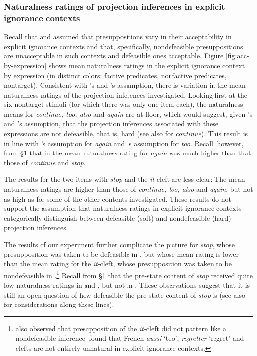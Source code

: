 \documentclass[11pt,fleqn]{article}
\newcommand{\6}{\mbox{$[\hspace*{-.6mm}[$}}
\newcommand{\9}{\mbox{$]\hspace*{-.6mm}]$}}
\newcommand{\citepos}[1]{\citeauthor{#1}'s \citeyear{#1}}
\begin{document}
\subsubsection{Naturalness ratings of projection inferences in explicit ignorance contexts}\label{s:analysis1}

Recall that \citealt{simons01} and \citealt{abusch10} assumed that presuppositions vary in their acceptability in explicit ignorance contexts and that, specifically, nondefeasible presuppositions are unacceptable in such contexts and defeasible ones  acceptable. Figure \ref{fig:acc-by-expression} shows mean naturalness ratings in the explicit ignorance context by expression (in distinct colors: \color{orange}factive predicates\color{black}, \color{black}nonfactive predicates\color{black}, \color{gray}nontarget\color{black}). Consistent with \citepos{simons01} and \citepos{abusch10} assumption, there is variation in the mean naturalness ratings of the projection inferences investigated. Looking first at the six nontarget stimuli (for which there was only one item each), the naturalness means for \emph{continue, too, also} and \emph{again} are at floor, which would suggest, given \citepos{simons01} and \citepos{abusch10} assumption, that the projection inferences associated with these expressions are not defeasible, that is, hard (see also \citealt[734ff.]{roberts-simons2024} for \emph{continue}). This result is in line with \citepos{simons01} assumption for \emph{again} and \citepos{abusch10} assumption for \emph{too}. Recall, however, from \S1 that in \citealt[Exp.~2]{kalomoiros-schwarz2024} the mean naturalness rating for \emph{again} was much higher than that those of \emph{continue} and \emph{stop}. 

The results for the two items with \emph{stop} and the \emph{it}-cleft are less clear: The mean naturalness ratings are higher than those of \emph{continue, too, also} and \emph{again}, but not as high as for some of the other contents investigated. These results do not support the assumption that naturalness ratings in explicit ignorance contexts categorically distinguish between defeasible (soft) and nondefeasible (hard) projection inferences. 

The results of our experiment further complicate the picture for \emph{stop}, whose presupposition was taken to be defeasible in \citealt{simons01}, but whose mean rating is lower than the mean rating for the \emph{it}-cleft, whose presupposition was taken to be nondefeasible in \citealt{abusch10}.\footnote{\citealt{smith-hall11} also observed that presupposition of the {\em it-}cleft did not pattern like a nondefeasible inference. \citealt{jayez-etal2015} found that French {\em aussi} `too', {\em regretter} `regret' and clefts are not entirely unnatural in explicit ignorance contexts.} Recall from \S1 that the pre-state content of \emph{stop} received quite low naturalness ratings in \citealt[Exp.~3]{mandelkern-etal2020} and \citealt[Exp.~2]{kalomoiros-schwarz2024}, but not in \citealt[Exp.~1]{kalomoiros-schwarz2024}. These observations suggest that it is still an open question of how defeasible the pre-state content of \emph{stop} is (see also \citealt[192f.]{abrusan2016} for considerations along these lines).
\end{document}
